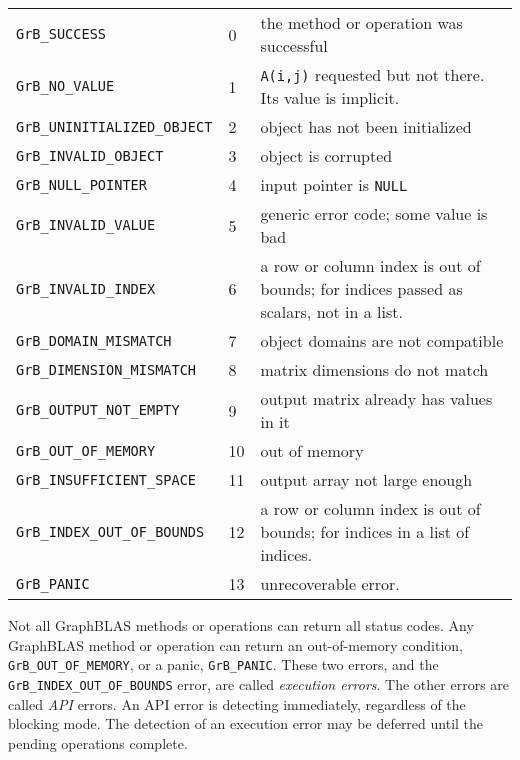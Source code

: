 \documentclass[12pt]{article}
\begin{document}
\vspace{0.2in}
\noindent
{\small
\begin{tabular}{llp{2.8in}}
\hline
\verb'GrB_SUCCESS'              & 0 & the method or operation was successful \\
\verb'GrB_NO_VALUE'             & 1 & \verb'A(i,j)' requested but not there.
                                  Its value is implicit. \\
\hline
\verb'GrB_UNINITIALIZED_OBJECT' & 2 & object has not been initialized \\
\verb'GrB_INVALID_OBJECT'       & 3 & object is corrupted \\
\verb'GrB_NULL_POINTER'         & 4 & input pointer is \verb'NULL' \\
\verb'GrB_INVALID_VALUE'        & 5 & generic error code; some value is bad \\
\verb'GrB_INVALID_INDEX'        & 6 & a row or column index is out of bounds;
                                for indices passed as scalars, not in a list. \\
\verb'GrB_DOMAIN_MISMATCH'      & 7 & object domains are not compatible \\
\verb'GrB_DIMENSION_MISMATCH'   & 8 & matrix dimensions do not match \\
\verb'GrB_OUTPUT_NOT_EMPTY'     & 9 & output matrix already has values in it \\
\hline
\verb'GrB_OUT_OF_MEMORY'        & 10 & out of memory \\
\verb'GrB_INSUFFICIENT_SPACE'   & 11 & output array not large enough \\
\verb'GrB_INDEX_OUT_OF_BOUNDS'  & 12 & a row or column index is out of bounds;
                                  for indices in a list of indices. \\
\hline
\verb'GrB_PANIC'                & 13 & unrecoverable error.
\\
\hline
\end{tabular}
\vspace{0.2in}
}

Not all GraphBLAS methods or operations can return all status codes.  Any
GraphBLAS method or operation can return an out-of-memory condition,
\verb'GrB_OUT_OF_MEMORY', or a panic, \verb'GrB_PANIC'.  These two errors, and
the \verb'GrB_INDEX_OUT_OF_BOUNDS' error, are called {\em execution errors}.
The other errors are called {\em API} errors.  An API error is detecting
immediately, regardless of the blocking mode.  The detection of an execution
error may be deferred until the pending operations complete.
\end{document}
